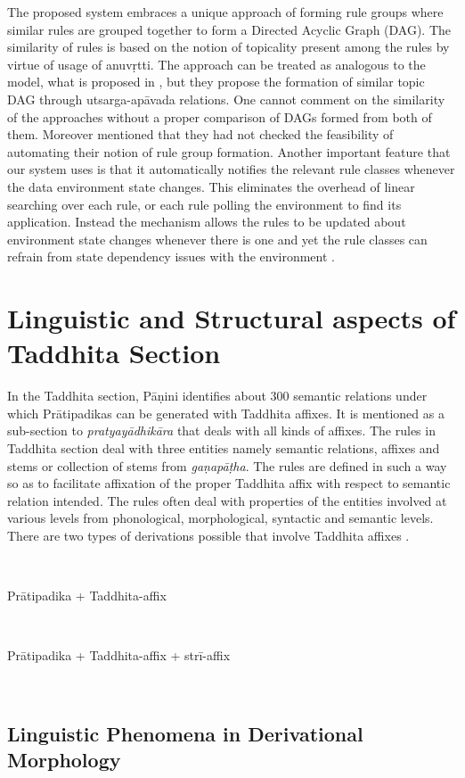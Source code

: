 \documentclass[11pt]{article}
\begin{document}
 The proposed system embraces a unique approach of forming rule groups where similar rules are grouped together to form a Directed Acyclic Graph (DAG). The similarity of rules is based on the notion of topicality present among the rules by virtue of usage of anuvṛtti. The approach can be treated as analogous to the model, what is proposed in , but they propose the formation of similar topic DAG through utsarga-apāvada relations. One cannot comment on the similarity of the approaches without a proper comparison of DAGs formed from both of them. Moreover  mentioned that they had not checked the feasibility of automating their notion of rule group formation. Another important feature that our system uses is that it automatically notifies the relevant rule classes whenever the data environment state changes. This eliminates the overhead of linear searching over each rule, or each rule polling the environment to find its application. Instead the mechanism allows the rules to be updated about environment state changes whenever there is one and yet the rule classes can refrain from state dependency issues with the environment \cite{szallies1997using}. 

\section{Linguistic and Structural aspects of Taddhita Section}
\label{intro}


In the Taddhita section, Pāṇini identifies about 300 semantic relations under which Prātipadikas can be generated with Taddhita affixes. It is mentioned as a sub-section to {\sl pratyayādhikāra} that deals with all kinds of affixes. The rules in Taddhita section deal with three entities namely semantic relations, affixes and stems or collection of stems from {\sl gaṇapāṭha}. The rules are defined in such a way so as to facilitate affixation of the proper Taddhita affix with respect to semantic relation intended. The rules often deal with properties of the entities involved at various levels from phonological, morphological, syntactic and semantic levels. There are two types of derivations possible that involve Taddhita affixes \cite{rsbook}.

\\ \centerline{Prātipadika + Taddhita-affix} \\ \centerline{Prātipadika + Taddhita-affix + strī-affix} 

\\
\subsection{Linguistic Phenomena in Derivational Morphology}
\end{document}
